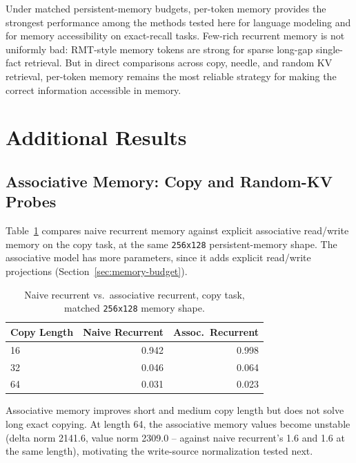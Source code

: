 \documentclass[10pt]{article} %
\begin{document}
Under matched persistent-memory budgets, per-token memory provides the
strongest performance among the methods tested here for language modeling
and for memory accessibility on exact-recall tasks. Few-rich recurrent
memory is not uniformly bad: RMT-style memory tokens are strong for
sparse long-gap single-fact retrieval. But in direct comparisons across
copy, needle, and random KV retrieval, per-token memory remains the most
reliable strategy for making the correct information accessible in
memory.

\appendix
\section{Additional Results}

\subsection{Associative Memory: Copy and Random-KV Probes}

Table~\ref{tab:assoc_copy} compares naive recurrent memory against explicit
associative read/write memory on the copy task, at the same \texttt{256x128}
persistent-memory shape. The associative model has more parameters, since
it adds explicit read/write projections (Section~\ref{sec:memory-budget}).

\begin{table}[h]
\centering
\caption{Naive recurrent vs.\ associative recurrent, copy task, matched
\texttt{256x128} memory shape.}
\label{tab:assoc_copy}
\begin{tabular}{lrr}
\toprule
Copy Length & Naive Recurrent & Assoc.\ Recurrent \\
\midrule
16 & 0.942 & 0.998 \\
32 & 0.046 & 0.064 \\
64 & 0.031 & 0.023 \\
\bottomrule
\end{tabular}
\end{table}

Associative memory improves short and medium copy length but does not solve
long exact copying. At length 64, the associative memory values become
unstable (delta norm 2141.6, value norm 2309.0 -- against naive recurrent's
1.6 and 1.6 at the same length), motivating the write-source normalization
tested next.
\end{document}
